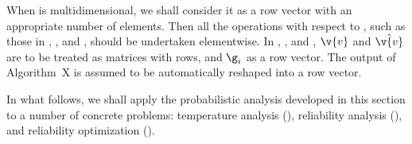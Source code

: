 \begin{remark}
When \g is multidimensional, we shall consider it as a row vector with an
appropriate number of elements. Then all the operations with respect to \g, such
as those in , , and
, should be undertaken elementwise. In
, , and
, $\v{v}$ and $\hat{\v{v}}$ are to be treated as
matrices with \nc rows, and $\g_i$ as a row vector. The output of Algorithm~X is
assumed to be automatically reshaped into a row vector.
\end{remark}

In what follows, we shall apply the probabilistic analysis developed in this
section to a number of concrete problems: temperature analysis
(), reliability analysis
(), and reliability optimization
().
